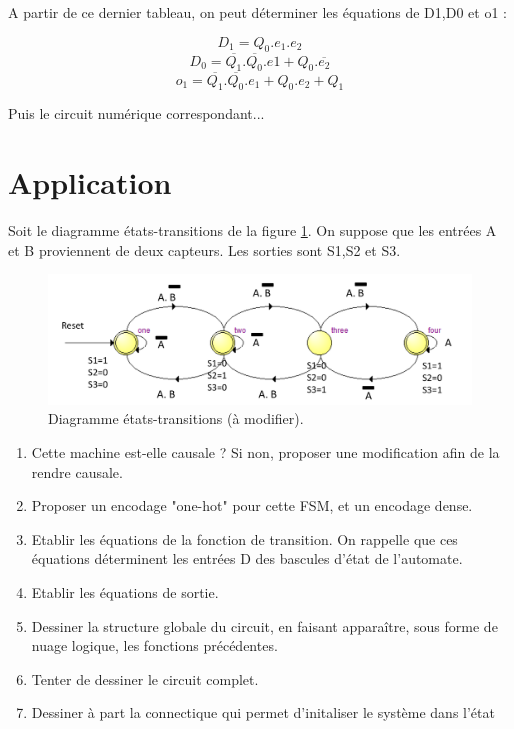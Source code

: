 \documentclass[a4paper,11pt]{article}
\begin{document}
A partir de ce dernier tableau, on peut déterminer les équations de D1,D0 et o1 :



$$D_1=Q_0.e_1.e_2$$
$$D_0=\overline{Q_1}.\overline{Q_0}.e1+Q_0.\overline{e_2}$$
$$o_1=\overline{Q_1}.\overline{Q_0}.e_1+Q_0.e_2+Q_1$$

Puis le circuit numérique correspondant...


\section{Application}
Soit le diagramme états-transitions de la figure \ref{exo1}. On suppose que les entrées A et B proviennent de deux capteurs.
Les sorties sont S1,S2 et S3.

\begin{figure}[!h]
  \begin{center}
    \includegraphics[scale=0.25]{./figures/exo1}
  \end{center}
  \caption{Diagramme états-transitions (à modifier).}
  \label{exo1}
\end{figure}

\begin{enumerate}
  \item Cette machine est-elle causale ? Si non, proposer une modification afin de la rendre causale.
  \item Proposer un encodage "one-hot" pour cette FSM, et un encodage dense.
  \item Etablir les équations de la fonction de transition. On rappelle que ces équations déterminent les entrées D des bascules d'état de l'automate.
  \item Etablir les équations de sortie.
  \item Dessiner la structure globale du circuit, en faisant apparaître, sous forme de nuage logique, les fonctions précédentes.
  \item Tenter de dessiner le circuit complet.
  \item Dessiner à part la connectique qui permet d'initaliser le système dans l'état
\end{enumerate}
\end{document}
